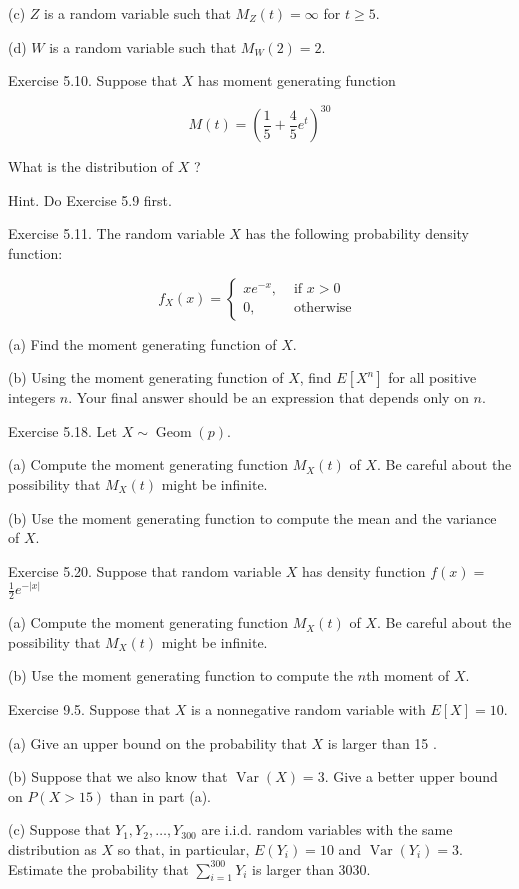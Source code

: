 \documentclass[10pt]{article}
\begin{document}
(c) $Z$ is a random variable such that $M_{Z}(t)=\infty$ for $t \geq 5$.

(d) $W$ is a random variable such that $M_{W}(2)=2$.

\hfill \break
Exercise 5.10. Suppose that $X$ has moment generating function

$$
M(t)=\left(\frac{1}{5}+\frac{4}{5} e^{t}\right)^{30}
$$

What is the distribution of $X$ ?

Hint. Do Exercise 5.9 first.

\hfill \break
Exercise 5.11. The random variable $X$ has the following probability density function:

$$
f_{X}(x)= \begin{cases}x e^{-x}, & \text { if } x>0 \\ 0, & \text { otherwise }\end{cases}
$$

(a) Find the moment generating function of $X$.

(b) Using the moment generating function of $X$, find $E\left[X^{n}\right]$ for all positive integers $n$. Your final answer should be an expression that depends only on $n$.

\hfill \break
Exercise 5.18. Let $X \sim \operatorname{Geom}(p)$.

(a) Compute the moment generating function $M_{X}(t)$ of $X$. Be careful about the possibility that $M_{X}(t)$ might be infinite.

(b) Use the moment generating function to compute the mean and the variance of $X$.

\hfill \break
Exercise 5.20. Suppose that random variable $X$ has density function $f(x)=$ $\frac{1}{2} e^{-|x|}$

(a) Compute the moment generating function $M_{X}(t)$ of $X$. Be careful about the possibility that $M_{X}(t)$ might be infinite.

(b) Use the moment generating function to compute the $n$th moment of $X$.

\hfill \break
Exercise 9.5. Suppose that $X$ is a nonnegative random variable with $E[X]=10$.

(a) Give an upper bound on the probability that $X$ is larger than 15 .

(b) Suppose that we also know that $\operatorname{Var}(X)=3$. Give a better upper bound on $P(X>15)$ than in part (a).

(c) Suppose that $Y_{1}, Y_{2}, \ldots, Y_{300}$ are i.i.d. random variables with the same distribution as $X$ so that, in particular, $E\left(Y_{i}\right)=10$ and $\operatorname{Var}\left(Y_{i}\right)=3$. Estimate the probability that $\sum_{i=1}^{300} Y_{i}$ is larger than 3030.
\end{document}
